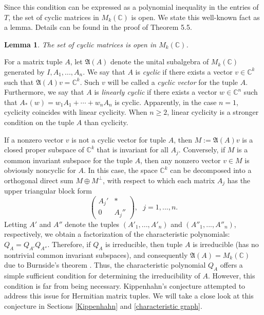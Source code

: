 \documentclass[draft, 12pt, reqno]{amsart}
\newcommand{\C}{{\mathbb C}}
\numberwithin{equation}{section}
\theoremstyle{plain}
\newtheorem{lemma}[theorem]{Lemma}
\begin{document}
Since this condition can be expressed as a polynomial inequality in the entries of $T$, the set of cyclic matrices in $M_k(\C)$ is open. We state this well-known fact as a lemma. Details can be found in the proof of Theorem 5.5. 
\begin{lemma}\label{cyclicM}
The set of cyclic matrices is open in $M_k(\C)$.
\end{lemma}
For a matrix tuple $A$, let ${\mathfrak A}(A)$ denote the unital subalgebra of $M_k(\C)$ generated by $I, A_1, ..., A_n$. We say that $A$ is {\em cyclic} if there exists a vector $v\in \C^k$ such that ${\mathfrak A}(A)v=\C^k$. Such $v$ will be called a {\em cyclic vector} for the tuple $A$. Furthermore, we say that $A$ is {\em linearly cyclic} if there exists a vector $w\in \C^n$ such that $A_*(w)=w_1A_1+\cdots +w_nA_n$ is cyclic. Apparently, in the case $n=1$, cyclicity coincides with linear cyclicity. When $n\geq 2$, linear cyclicity is a stronger condition on the tuple $A$ than cyclicity. 

If a nonzero vector $v$ is not a cyclic vector for tuple $A$, then $M:={\mathfrak A}(A)v$ is a closed proper subspace of $\C^k$ that is invariant for all $A_j$. Conversely, if $M$ is a common invariant subspace for the tuple $A$, then any nonzero vector $v\in M$ is obviously noncyclic for $A$. In this case, the space $\C^k$ can be decomposed into a orthogonal direct sum $M\oplus M^\perp$,
with respect to which each matrix $A_j$ has the upper triangular block form 
\begin{equation}\label{decom}
\begin{pmatrix} A_j' & \ast \\ 0 & A_j'' \end{pmatrix},\ \ \ j=1, ...,n.
\end{equation}Letting $A'$ and $A''$ denote the tuples $(A'_1, ..., A'_n)$ and $(A''_1, ..., A''_n)$, respectively, we obtain a factorization of the characteristic polynomials: $Q_A=Q_{A'}Q_{A''}$. Therefore, if $Q_A$ is irreducible, then tuple $A$ is irreducible (has no nontrivial common invariant subspaces), and consequently $\mathfrak{A}(A)=M_k(\C)$ due to Burnside's theorem \cite{Bur,LR}. Thus, the characteristic polynomial $Q_A$ offers a simple sufficient condition for determining the irreducibility of $A$. However, this condition is far from being necessary. Kippenhahn's conjecture \cite{Ki} attempted to address this issue for Hermitian matrix tuples. We will take a close look at this conjecture in Sections \ref{Kippenhahn} and \ref{characteristic graph}.
\end{document}
